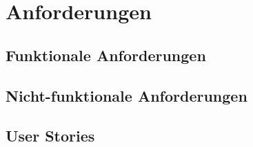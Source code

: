 \section{Anforderungen}
\subsection{Funktionale Anforderungen}

\subsection{Nicht-funktionale Anforderungen}
\subsection{User Stories}